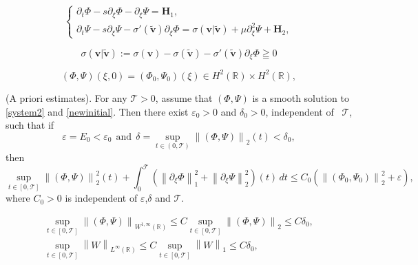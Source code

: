 \documentclass[10pt,a4paper]{amsart}
\def\R{\mathbb{R}}
\def\T{\mathcal{T}}
\def\p{\partial}
\newcommand{\norm}[1]{\left\lVert #1 \right\rVert}
\begin{document}
\begin{equation}\label{system2}
	\begin{cases}
		\p_t\Phi-s\p_{\xi}\Phi-\p_{\xi}\Psi=\mathbf{H}_1,\\
		\p_t\Psi-s\p_{\xi}\Psi-\sigma'(\mathbf{\tilde{v}})\p_{\xi}\Phi=\sigma(\mathbf{v}|\mathbf{\tilde{v}})+\mu \p^2_{\xi}\Psi+\mathbf{H}_2,
	\end{cases}
\end{equation}

\begin{equation}\label{hterm}
	\sigma(\mathbf{v}|\mathbf{\tilde{v}}):=\sigma(\mathbf{v})-\sigma(\mathbf{\tilde{v}})-\sigma'(\mathbf{\tilde{v}})\p_{\xi}\Phi\geqq 0
\end{equation}

\begin{equation}\label{newinitial}
	(\Phi,\Psi)(\xi,0)=(\Phi_0,\Psi_0)(\xi) \in H^2(\R) \times H^2(\R),
\end{equation}

\begin{proposition}\label{mainpro}
	(A priori estimates). For any $\T>0$, assume that $(\Phi,\Psi)$ is a smooth solution to \eqref{system2} and \eqref{newinitial}. Then there
	exist $\varepsilon_0>0$ and $\delta_0>0$, independent of ~$\T$, such that if 
	\begin{equation}\label{initialsmall}
		\varepsilon=E_0<\varepsilon_0~~\text{and}~~\delta=\mathop{sup}\limits_{t \in (0,\T)}\norm{(\Phi,\Psi)}_2(t)<\delta_0,
	\end{equation}
	then
	\begin{equation}\label{proesti}
		\mathop{sup}\limits_{t \in [0,\T]}\norm{(\Phi,\Psi)}^2_2(t)+\int_{0}^{\T}(\norm{\p_{\xi}\Phi}^2_1+\norm{\p_{\xi}\Psi}^2_2)(t)  \,dt\leq C_0
		(\norm{(\Phi_0,\Psi_0)}^2_2+\varepsilon),
	\end{equation}
	where $C_0>0$ is independent of $\varepsilon$,$\delta$ and $\T$.
\end{proposition}

\begin{equation}\label{small1}
	\begin{aligned}
		\mathop{sup}\limits_{t \in [0,\T]}\norm{(\Phi,\Psi)}_{W^{1,\infty}(\R)}\leq C\mathop{sup}\limits_{t \in [0,\T]}\norm{(\Phi,\Psi)}_2\leq C\delta_0,\\
		\mathop{sup}\limits_{t \in [0,\T]}\norm{W}_{L^{\infty}(\R)}\leq C\mathop{sup}\limits_{t \in [0,\T]}\norm{W}_1\leq C\delta_0,
	\end{aligned}
\end{equation}
\end{document}
